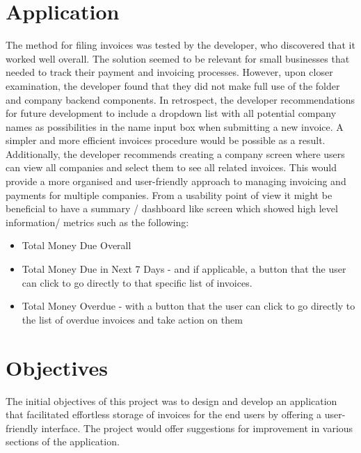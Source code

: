 \section{Application}
The method for filing invoices was tested by the developer, who discovered that it worked well overall. The solution seemed to be relevant for small businesses that needed to track their payment and invoicing processes.
\newline \newline
However, upon closer examination, the developer found that they did not make full use of the folder and company backend components. In retrospect, the developer recommendations for future development to include a dropdown list with all potential company names as possibilities in the name input box when submitting a new invoice. A simpler and more efficient invoices procedure would be possible as a result.
\newline \newline
Additionally, the developer recommends creating a company screen where users can view all companies and select them to see all related invoices. This would provide a more organised and user-friendly approach to managing invoicing and payments for multiple companies.
\newline \newline
From a usability point of view it might be beneficial to have a summary / dashboard like screen which showed high level information/ metrics such as the following:
\begin{itemize}
    \item Total Money Due Overall
    \item Total Money Due in Next 7 Days - and if applicable, a button that the user can click to go directly to that specific list of invoices.
    \item Total Money Overdue - with a button that the user can click to go directly to the list of overdue invoices and take action on them
\end{itemize}


\section{Objectives}
The initial objectives of this project was to design and develop an application that facilitated effortless storage of invoices for the end users by offering a user-friendly interface. The project would offer suggestions for improvement in various sections of the application.

